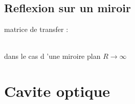 \documentclass[12pt]{book}
\begin{document}
        \subsection{Reflexion sur un miroir}
            matrice de transfer :
            \begin{center}
                 \\ dans le cas d 'une miroire plan $R \to \infty$
            \end{center} 
    \section{Cavite optique}
\end{document}

